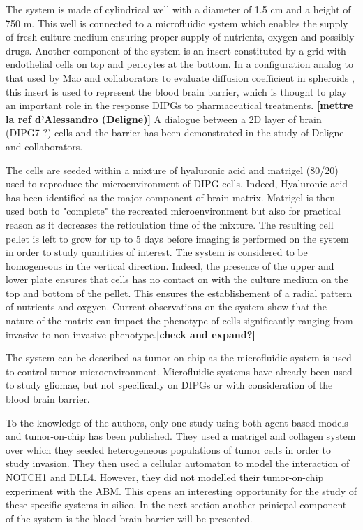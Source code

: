 \documentclass[11pt,a4paper]{article}
\begin{document}
The system is made of cylindrical well with a diameter of 1.5 cm and a height of 750 \textmu m. This well is connected to a microfluidic system which enables the supply of fresh culture medium ensuring proper supply of nutrients, oxygen and possibly drugs. Another component of the system is an insert constituted by a grid with endothelial cells on top and pericytes at the bottom. In a configuration analog to that used by Mao and collaborators to evaluate diffusion coefficient in spheroids \cite{Mao2018}, this insert is used to represent the blood brain barrier, which is thought to play an important role in the response DIPGs to pharmaceutical treatments. \textbf{[mettre la ref d'Alessandro (Deligne)]} A dialogue between a 2D layer of brain (DIPG7 ?) cells and the barrier has been demonstrated in the study of Deligne and collaborators.

The cells are seeded within a mixture of hyaluronic acid and matrigel (80/20) used to reproduce the microenvironment of DIPG cells. Indeed, Hyaluronic acid has been identified as the major component of brain matrix. Matrigel is then used both to "complete" the recreated microenvironment but also for practical reason as it decreases the reticulation time of the mixture. The resulting cell pellet is left to grow for up to 5 days before imaging is performed on the system in order to study quantities of interest. The system is considered to be homogeneous in the vertical direction. Indeed, the presence of the upper and lower plate ensures that cells has no contact on with the culture medium on the top and bottom of the pellet. This ensures the establishement of a radial pattern of nutrients and oxgyen. Current observations on the system show that the nature of the matrix can impact the phenotype of cells significantly ranging from invasive to non-invasive phenotype.\textbf{[check and expand?]}

The system can be described as tumor-on-chip as the microfluidic system is used to control tumor microenvironment. Microfluidic systems have already been used to study gliomae, but not specifically on DIPGs or with consideration of the blood brain barrier.\cite{Liu2021} 

To the knowledge of the authors, only one study using both agent-based models and tumor-on-chip has been published.\cite{Torab2021} They used a matrigel and collagen system over which they seeded heterogeneous populations of tumor cells in order to study invasion. They then used a cellular automaton to model the interaction of NOTCH1 and DLL4. However, they did not modelled their tumor-on-chip experiment with the ABM. This opens an interesting opportunity for the study of these specific systems in silico. In the next section another prinicpal component of the system is the blood-brain barrier will be presented.
\end{document}
